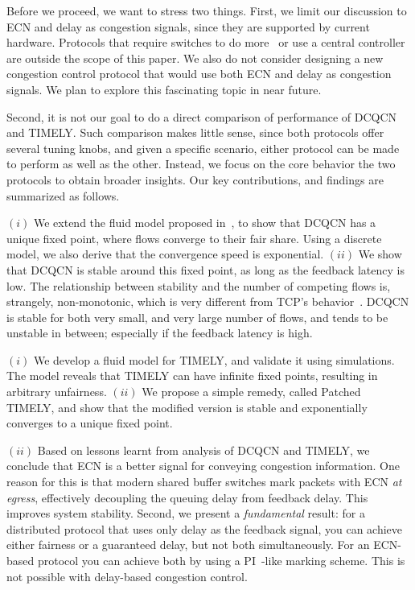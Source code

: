 Before we proceed, we want to stress two things.  First, we limit our discussion
to ECN and delay as congestion signals, since they are supported by current
hardware. Protocols that require switches to do
more~\cite{katabi2002congestion,rcp,pfabric} or use a central
controller~\cite{deadline,perry2014fastpass} are outside the scope of this
paper. We also do not consider designing a new congestion control protocol that
would use both ECN and delay as congestion signals. We plan to explore this
fascinating topic in near future.

Second, it is not our goal to do a direct comparison of performance of DCQCN and
TIMELY.  Such comparison makes little sense, since both protocols offer several
tuning knobs, and given a specific scenario, either protocol can be made to
perform as well as the other. Instead, we focus on the core behavior the two
protocols to obtain broader insights.  Our key contributions, and findings are
summarized as follows.

 $(i)$ We extend the fluid model proposed in~\cite{dcqcn}, to show
that DCQCN has a unique fixed point, where flows converge to their fair share.
Using a discrete model, we also derive that the convergence speed is exponential.
$(ii)$ We show that DCQCN is stable around this fixed point, as long as the
feedback latency is low. The relationship between stability and the number of
competing flows is, strangely, non-monotonic, which is very different from TCP's
behavior~\cite{misra:TAC2002}. DCQCN is stable for both very small, and very
large number of flows, and tends to be unstable in between; especially if the
feedback latency is high.

 $(i)$ We develop a fluid model for TIMELY, and validate it using
simulations. The model reveals that TIMELY can have infinite fixed points,
resulting in arbitrary unfairness.  $(ii)$ We propose a simple remedy, called Patched TIMELY, and show
that the modified version is stable and exponentially converges to a unique fixed 
point. 

 
$(ii)$ Based on lessons learnt from analysis of DCQCN and TIMELY,
we conclude that ECN is a better signal for conveying congestion information.
One reason for this is that modern shared buffer switches mark packets with ECN
{\em at egress}, effectively decoupling the queuing delay from feedback delay.
This improves system stability. Second, we present a \emph{fundamental} result:
for a distributed protocol that uses only delay as the feedback signal, you can
achieve either fairness or a guaranteed delay, but not both simultaneously. For
an ECN-based protocol you can achieve both by using a
PI~\cite{hollot2001designing}-like marking scheme. This is not possible with
delay-based congestion control. 

